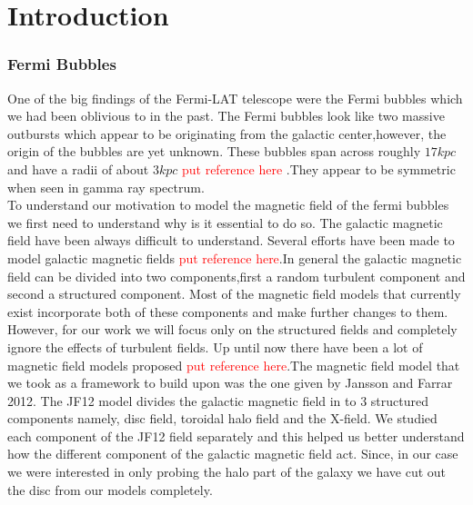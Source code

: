 \documentclass[12pt, a4 paper]{article}
\begin{document}
\begin{titlepage}


\end{titlepage}
\tableofcontents
\newpage
\section{Introduction}
\subsubsection{Fermi Bubbles}

One of the big findings of the Fermi-LAT telescope were the Fermi bubbles which we had been oblivious to in the past. The Fermi bubbles look like two massive outbursts which appear to be originating from the galactic center,however, the origin of the bubbles are yet unknown. These bubbles span across roughly $17kpc$ and have a radii of about $3kpc$ \textcolor{red}{put reference here} .They appear to be symmetric when seen in gamma ray spectrum.\\

To understand our motivation to model the magnetic field of the fermi bubbles we first need to understand why is it essential to do so.
The galactic magnetic field have been always difficult to understand. Several efforts have been made to model galactic magnetic fields \textcolor{red}{put reference here}.In general the galactic magnetic field can be divided into two components,first a random turbulent component and second a structured component.
Most of the magnetic field models that currently exist incorporate both of these components and make further changes to them.\\

However, for our work we will focus only on the structured fields and completely ignore the effects of turbulent fields.
Up until now there have been a lot of magnetic field models proposed  \textcolor{red}{put reference here}.The magnetic field model that we took as a framework to build upon was the one given by Jansson and Farrar 2012. The JF12 model divides the galactic magnetic field in to $3$ structured components namely, disc field, toroidal halo field and the X-field. We studied each component of the JF12 field separately and this helped us better understand how the different component of the galactic magnetic field act. Since, in our case we were interested in only probing the halo part of the galaxy we have cut out the disc from our models completely. 
\end{document}
